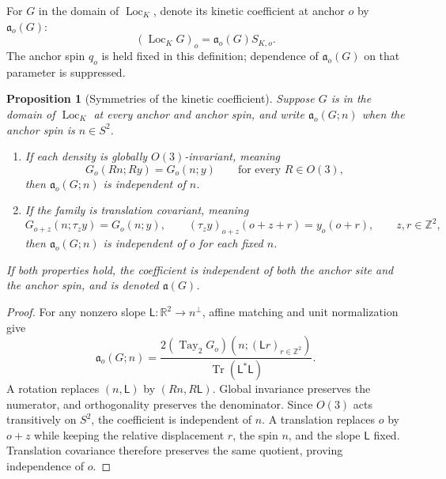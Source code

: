 \documentclass[11pt]{article}
\newcommand{\R}{\mathbb R}
\newcommand{\Z}{\mathbb Z}
\newcommand{\tr}{\operatorname{Tr}}
\newcommand{\Tay}{\operatorname{Tay}}
\newcommand{\Loc}{\operatorname{Loc}}
\numberwithin{equation}{section}
\newtheorem{proposition}[theorem]{Proposition}
\theoremstyle{definition}
\theoremstyle{plain}
\begin{document}
For $G$ in the domain of $\Loc_K$, denote its kinetic coefficient
at anchor $o$ by $\mathfrak a_o(G)$:
\begin{equation}
 (\Loc_K G)_o=\mathfrak a_o(G)S_{K,o}.
 \label{eq:kinetic-loc}
\end{equation}
The anchor spin $q_o$ is held fixed in this definition;
dependence of $\mathfrak a_o(G)$ on that parameter is suppressed.


\begin{proposition}[Symmetries of the kinetic coefficient]
\label{prop:kinetic-coefficient-symmetries}
Suppose $G$ is in the domain of $\Loc_K$ at every anchor and
anchor spin, and write $\mathfrak a_o(G;n)$ when the anchor spin
is $n\in S^2$.
\begin{enumerate}
\item If each density is globally $O(3)$-invariant, meaning
\begin{equation}
 G_o(Rn;Ry)=G_o(n;y)
 \qquad\text{for every }R\in O(3),
\end{equation}
then $\mathfrak a_o(G;n)$ is independent of $n$.
\item If the family is translation covariant, meaning
\begin{equation}
 G_{o+z}(n;\tau_z y)=G_o(n;y),
 \qquad
 (\tau_z y)_{o+z}(o+z+r)=y_o(o+r),
 \qquad z,r\in\Z^2,
\end{equation}
then $\mathfrak a_o(G;n)$ is independent of $o$ for each fixed $n$.
\end{enumerate}
If both properties hold, the coefficient is independent of
both the anchor site and the anchor spin, and is denoted
$\mathfrak a(G)$.
\end{proposition}

\begin{proof}
For any nonzero slope $\mathsf L:\R^2\to n^\perp$, affine
matching and unit normalization give
\begin{equation}
 \mathfrak a_o(G;n)
 =\frac{2(\Tay_2G_o)(n;(\mathsf L r)_{r\in\Z^2})}
        {\tr(\mathsf L^*\mathsf L)}.
\end{equation}
A rotation replaces $(n,\mathsf L)$ by $(Rn,R\mathsf L)$.
Global invariance preserves the numerator, and orthogonality
preserves the denominator.  Since $O(3)$ acts transitively on
$S^2$, the coefficient is independent of $n$.
A translation replaces $o$ by $o+z$ while keeping the
relative displacement $r$, the spin $n$, and the slope
$\mathsf L$ fixed.  Translation covariance therefore preserves
the same quotient, proving independence of $o$.
\end{proof}
\end{document}
